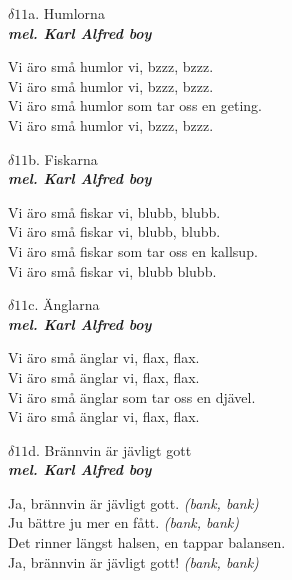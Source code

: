 \documentclass[a6paper,10pt]{article}
\newcommand{\mel}[1]{\small\textbf{\textit{mel. #1 \\}}}
\begin{document}
\setlength{\oddsidemargin}{-0.47in}
\noindent
\begin{center}
\Large $\delta11$a. Humlorna\\ 
\mel{Karl Alfred boy}
\end{center}
Vi äro små humlor vi, bzzz, bzzz. \\
Vi äro små humlor vi, bzzz, bzzz. \\
Vi äro små humlor som tar oss en geting. \\
Vi äro små humlor vi, bzzz, bzzz. 
\begin{center}
\Large $\delta11$b. Fiskarna\\ 
\mel{Karl Alfred boy}
\end{center}
Vi äro små fiskar vi, blubb, blubb. \\
Vi äro små fiskar vi, blubb, blubb. \\
Vi äro små fiskar som tar oss en kallsup. \\
Vi äro små fiskar vi, blubb blubb. 
\begin{center}
\Large $\delta11$c. Änglarna\\ 
\mel{Karl Alfred boy}
\end{center}
Vi äro små änglar vi, flax, flax.\\
Vi äro små änglar vi, flax, flax.\\
Vi äro små änglar som tar oss en djävel.\\
Vi äro små änglar vi, flax, flax.
\begin{center}
\Large $\delta11$d. Brännvin är jävligt gott\\
\mel{Karl Alfred boy}
\end{center}
Ja, brännvin är jävligt gott. \textit{(bank, bank)}\\
Ju bättre ju mer en fått. \textit{(bank, bank)}\\
Det rinner längst halsen, en tappar balansen. \\
Ja, brännvin är jävligt gott! \textit{(bank, bank)}
\end{document}
